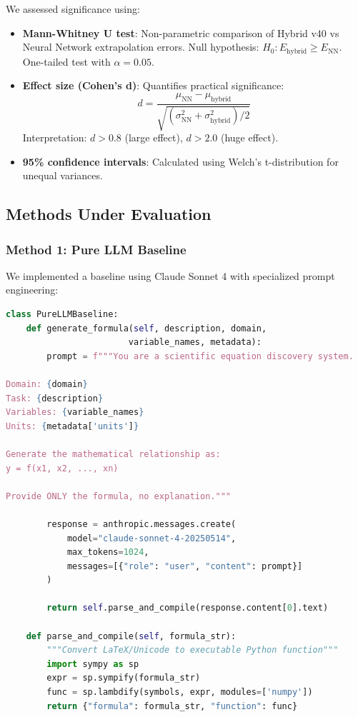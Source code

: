 \documentclass[twoside,11pt]{article}
\begin{document}
We assessed significance using:

\begin{itemize}
    \item \textbf{Mann-Whitney U test}: Non-parametric comparison of Hybrid v40 vs Neural Network extrapolation errors. Null hypothesis: $H_0: E_{\text{hybrid}} \geq E_{\text{NN}}$. One-tailed test with $\alpha = 0.05$.
    
    \item \textbf{Effect size (Cohen's d)}: Quantifies practical significance:
    \begin{equation}
    d = \frac{\mu_{\text{NN}} - \mu_{\text{hybrid}}}{\sqrt{(\sigma_{\text{NN}}^2 + \sigma_{\text{hybrid}}^2)/2}}
    \end{equation}
    Interpretation: $d > 0.8$ (large effect), $d > 2.0$ (huge effect).
    
    \item \textbf{95\% confidence intervals}: Calculated using Welch's t-distribution for unequal variances.
\end{itemize}


\subsection{Methods Under Evaluation}

\subsubsection{Method 1: Pure LLM Baseline}

We implemented a baseline using Claude Sonnet 4 with specialized prompt engineering:

\begin{lstlisting}[language=Python, caption=Pure LLM Formula Generation]
class PureLLMBaseline:
    def generate_formula(self, description, domain, 
                        variable_names, metadata):
        prompt = f"""You are a scientific equation discovery system.
        
Domain: {domain}
Task: {description}
Variables: {variable_names}
Units: {metadata['units']}

Generate the mathematical relationship as:
y = f(x1, x2, ..., xn)

Provide ONLY the formula, no explanation."""

        response = anthropic.messages.create(
            model="claude-sonnet-4-20250514",
            max_tokens=1024,
            messages=[{"role": "user", "content": prompt}]
        )
        
        return self.parse_and_compile(response.content[0].text)
    
    def parse_and_compile(self, formula_str):
        """Convert LaTeX/Unicode to executable Python function"""
        import sympy as sp
        expr = sp.sympify(formula_str)
        func = sp.lambdify(symbols, expr, modules=['numpy'])
        return {"formula": formula_str, "function": func}
\end{lstlisting}
\end{document}
